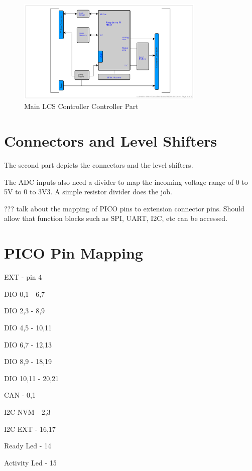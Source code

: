 \begin{figure}[htbp]
    \centering
    \includegraphics[page=2, width=0.8\textwidth]{./Schematics/Schematic_LcsNodes-Main-Controller-Board.pdf}
    \caption{Main LCS Controller Controller Part}
\end{figure}
\FloatBarrier

\section{Connectors and Level Shifters}

The second part depicts the connectors and the level shifters.

The ADC inputs also need a divider to map the incoming voltage range of 0 to 5V to 0 to 3V3. A simple resistor divider does the job.


??? talk about the mapping of PICO pins to extension connector pins. Should allow that function blocks such as SPI, UART, I2C, etc can be accessed.

\section{PICO Pin Mapping}

EXT             - pin 4

DIO 0,1         - 6,7

DIO 2,3         - 8,9

DIO 4,5         - 10,11

DIO 6,7         - 12,13

DIO 8,9         - 18,19

DIO 10,11       - 20,21

CAN             - 0,1

I2C NVM         - 2,3

I2C EXT         - 16,17

Ready Led       - 14

Activity Led    - 15



